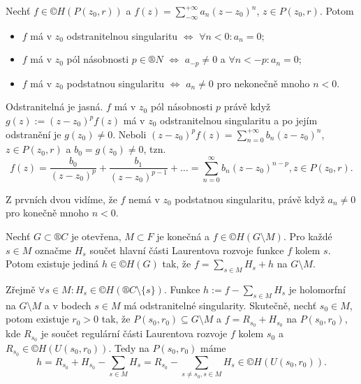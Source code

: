 \documentclass[12pt]{article}					%
\begin{document}
\begin{veta}
	Nechť $f \in ©H(P(z_0, r))$ a $f(z) = \sum_{-∞}^{+∞} a_n(z - z_0)^n$, $z \in P(z_0, r)$. Potom

	\begin{itemize}
		\item $f$ má v $z_0$ odstranitelnou singularitu $\Leftrightarrow$ $\forall n < 0: a_n = 0$;
		\item $f$ má v $z_0$ pól násobnosti $p \in ®N$ $\Leftrightarrow$ $a_{-p} ≠ 0$ a $\forall n < -p: a_n = 0$;
		\item $f$ má v $z_0$ podstatnou singularitu $\Leftrightarrow$ $a_n ≠ 0$ pro nekonečně mnoho $n < 0$.
	\end{itemize}

	\begin{dukazin}
		Odstranitelná je jasná. $f$ má v $z_0$ pól násobnosti $p$ právě když $g(z) := (z - z_0)^p f(z)$ má v $z_0$ odstranitelnou singularitu a po jejím odstranění je $g(z_0) ≠ 0$. Neboli $(z - z_0)^p f(z) = \sum_{n=0}^{+∞} b_n(z - z_0)^n$, $z \in P(z_0, r)$ a $b_0 = g(z_0) ≠ 0$, tzn.
		$$ f(z) = \frac{b_0}{(z - z_0)^p} + \frac{b_1}{(z - z_0)^{p-1}} + … = \sum_{n=0}^∞ b_n(z - z_0)^{n - p}, z \in P(z_0, r). $$

		Z prvních dvou vidíme, že $f$ nemá v $z_0$ podstatnou singularitu, právě když $a_n ≠ 0$ pro konečně mnoho $n < 0$.
	\end{dukazin}
\end{veta}

\begin{veta}
	Nechť $G \subset ®C$ je otevřena, $M \subset F$ je konečná a $f \in ©H(G \setminus M)$. Pro každé $s \in M$ označme $H_s$ součet hlavní části Laurentova rozvoje funkce $f$ kolem $s$. Potom existuje jediná $h \in ©H(G)$ tak, že $f = \sum_{s \in M} H_s + h$ na $G \setminus M$.

	\begin{dukazin}
		Zřejmě $\forall s \in M: H_s \in ©H(®C \setminus \{s\})$. Funkce $h := f - \sum_{s \in M} H_s$ je holomorfní na $G \setminus M$ a v bodech $s \in M$ má odstranitelné singularity. Skutečně, nechť $s_0 \in M$, potom existuje $r_0 > 0$ tak, že $P(s_0, r_0) \subseteq G \setminus M$ a $f = R_{s_0} + H_{s_0}$ na $P(s_0, r_0)$, kde $R_{s_0}$ je součet regulární části Laurentova rozvoje $f$ kolem $s_0$ a $R_{s_0} \in ©H(U(s_0, r_0))$. Tedy na $P(s_0, r_0)$ máme
		$$ h = R_{s_0} + H_{s_0} - \sum_{s \in M} H_s = R_{s_0} - \sum_{s ≠ s_0, s \in M} H_s \in ©H(U(s_0, r_0)). $$
	\end{dukazin}
\end{veta}
\end{document}
